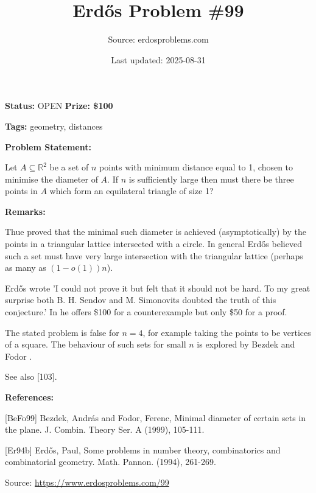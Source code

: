 \documentclass{article}
\title{Erd\H{o}s Problem \#99}
\date{Last updated: 2025-08-31}
\author{Source: erdosproblems.com}
\begin{document}
\maketitle

\noindent\textbf{Status:} OPEN \quad \textbf{Prize: \$100}

\noindent\textbf{Tags:} geometry, distances

\medskip
\noindent\textbf{Problem Statement:}

Let $A\subseteq\mathbb{R}^2$ be a set of $n$ points with minimum distance equal to 1, chosen to minimise the diameter of $A$. If $n$ is sufficiently large then must there be three points in $A$ which form an equilateral triangle of size 1?

\bigskip
\noindent\textbf{Remarks:}

Thue proved that the minimal such diameter is achieved (asymptotically) by the points in a triangular lattice intersected with a circle. In general Erd\H{o}s believed such a set must have very large intersection with the triangular lattice (perhaps as many as $(1-o(1))n$).

Erd\H{o}s \cite{Er94b} wrote 'I could not prove it but felt that it should not be hard. To my great surprise both B. H. Sendov and M. Simonovits doubted the truth of this conjecture.' In \cite{Er94b} he offers \$100 for a counterexample but only \$50 for a proof.

The stated problem is false for $n=4$, for example taking the points to be vertices of a square. The behaviour of such sets for small $n$ is explored by Bezdek and Fodor \cite{BeFo99}.

See also [103].

\bigskip
\noindent\textbf{References:}

[BeFo99] Bezdek, Andr\'{a}s and Fodor, Ferenc, Minimal diameter of certain sets in the plane. J. Combin. Theory Ser. A (1999), 105-111.
 
 [Er94b] Erd\H{o}s, Paul, Some problems in number theory, combinatorics and combinatorial geometry. Math. Pannon. (1994), 261-269.

\bigskip
\noindent\small{Source: \url{https://www.erdosproblems.com/99}}
\end{document}
